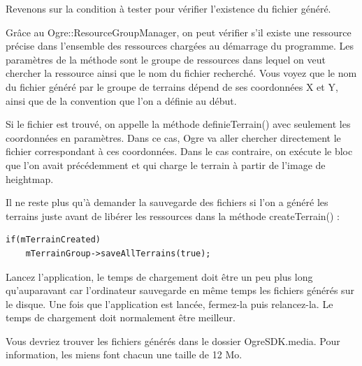 Revenons sur la condition \`a tester pour v\'erifier l'existence du fichier g\'en\'er\'e.

Gr\^ace au Ogre::ResourceGroupManager, on peut v\'erifier s'il existe une ressource pr\'ecise dans l'ensemble des ressources charg\'ees au d\'emarrage du programme. Les param\`etres de la m\'ethode sont le groupe de ressources dans lequel on veut chercher la ressource ainsi que le nom du fichier recherch\'e. Vous voyez que le nom du fichier g\'en\'er\'e par le groupe de terrains d\'epend de ses coordonn\'ees X et Y, ainsi que de la convention que l'on a d\'efinie au d\'ebut.

Si le fichier est trouv\'e, on appelle la m\'ethode definieTerrain() avec seulement les coordonn\'ees en param\`etres. Dans ce cas, Ogre va aller chercher directement le fichier correspondant \`a ces coordonn\'ees. Dans le cas contraire, on ex\'ecute le bloc que l'on avait pr\'ec\'edemment et qui charge le terrain \`a partir de l'image de heightmap.

Il ne reste plus qu'\`a demander la sauvegarde des fichiers si l'on a g\'en\'er\'e les terrains juste avant de lib\'erer les ressources dans la m\'ethode createTerrain() :

\begin{lstlisting}[caption={}]
if(mTerrainCreated)
    mTerrainGroup->saveAllTerrains(true);
\end{lstlisting}


Lancez l'application, le temps de chargement doit \^etre un peu plus long qu'auparavant car l'ordinateur sauvegarde en m\^eme temps les fichiers g\'en\'er\'es sur le disque. Une fois que l'application est lanc\'ee, fermez-la puis relancez-la. Le temps de chargement doit normalement \^etre meilleur.

Vous devriez trouver les fichiers g\'en\'er\'es dans le dossier OgreSDK.media. Pour information, les miens font chacun une taille de 12 Mo.
























